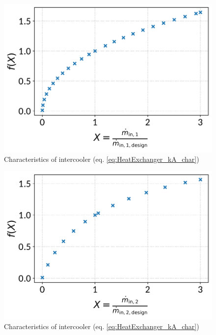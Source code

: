 \begin{minipage}{0.5\textwidth}
\begin{figure}[H]\begin{center}
\includegraphics[width=\textwidth]{figures/HeatExchanger_CharLine_kA_char1_intercooler.pdf}
\caption{Characteristics of intercooler (eq. \ref{eq:HeatExchanger_kA_char})}
\label{fig:CharLine_kA_char1_intercooler}
\end{center}\end{figure}

\end{minipage}
\begin{minipage}{0.5\textwidth}
\begin{figure}[H]\begin{center}
\includegraphics[width=\textwidth]{figures/HeatExchanger_CharLine_kA_char2_intercooler.pdf}
\caption{Characteristics of intercooler (eq. \ref{eq:HeatExchanger_kA_char})}
\label{fig:CharLine_kA_char2_intercooler}
\end{center}\end{figure}

\end{minipage}


